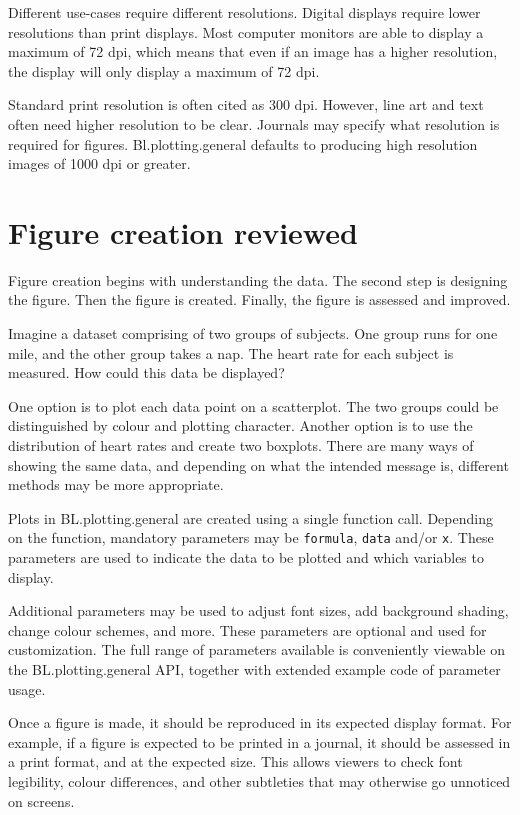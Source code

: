 \documentclass[letterpaper]{article}\usepackage[]{graphicx}\usepackage[]{color}
\begin{document}
Different use-cases require different resolutions. Digital displays require lower resolutions than print displays. Most computer monitors are able to display a maximum of 72 dpi, which means that even if an image has a higher resolution, the display will only display a maximum of 72 dpi. 

Standard print resolution is often cited as 300 dpi. However, line art and text often need higher resolution to be clear. Journals may specify what resolution is required for figures. Bl.plotting.general defaults to producing high resolution images of 1000 dpi or greater.

\section{Figure creation reviewed}
Figure creation begins with understanding the data. The second step is designing the figure. Then the figure is created. Finally, the figure is assessed and improved.

Imagine a dataset comprising of two groups of subjects. One group runs for one mile, and the other group takes a nap. The heart rate for each subject is measured. How could this data be displayed? 

One option is to plot each data point on a scatterplot. The two groups could be distinguished by colour and plotting character. Another option is to use the distribution of heart rates and create two boxplots. There are many ways of showing the same data, and depending on what the intended message is, different methods may be more appropriate.

Plots in BL.plotting.general are created using a single function call. Depending on the function, mandatory parameters may be \verb|formula|, \verb|data| and/or \verb|x|. These parameters are used to indicate the data to be plotted and which variables to display.

Additional parameters may be used to adjust font sizes, add background shading, change colour schemes, and more. These parameters are optional and used for customization. The full range of parameters available is conveniently viewable on the BL.plotting.general API, together with extended example code of parameter usage.

Once a figure is made, it should be reproduced in its expected display format. For example, if a figure is expected to be printed in a journal, it should be assessed in a print format, and at the expected size. This allows viewers to check font legibility, colour differences, and other subtleties that may otherwise go unnoticed on screens.
\end{document}
